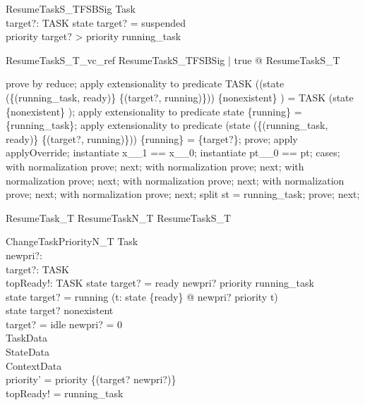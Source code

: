 \begin{schema}{ResumeTaskS\_TFSBSig}
  Task\\
  target?: TASK
\where
  state target? = suspended\\
  priority target? > priority running\_task
\end{schema}

\begin{theorem}{ResumeTaskS\_T\_vc\_ref}
\forall  ResumeTaskS\_TFSBSig | true @ \pre  ResumeTaskS\_T
\end{theorem}

\begin{zproof}
prove by reduce;
apply extensionality to predicate TASK \setminus  ((state \oplus  (\{(running\_task, ready)\} \cup  \{(target?, running)\})) \inv  \limg  \{nonexistent\} \rimg ) = TASK \setminus  (state \inv  \limg  \{nonexistent\} \rimg );
apply extensionality to predicate state \inv  \limg  \{running\} \rimg  = \{running\_task\};
apply extensionality to predicate (state \oplus  (\{(running\_task, ready)\} \cup  \{(target?, running)\})) \inv  \limg  \{running\} \rimg  = \{target?\};
prove;
apply applyOverride;
instantiate x\_\_1 == x\_\_0;
instantiate pt\_\_0 == pt;
cases;
with normalization prove;
next;
with normalization prove;
next;
with normalization prove;
next;
with normalization prove;
next;
with normalization prove;
next;
with normalization prove;
next;
split st = running\_task;
prove;
next;
\end{zproof}

\begin{zed}
ResumeTask\_T  ResumeTaskN\_T \lor  ResumeTaskS\_T
\end{zed}

\begin{schema}{ChangeTaskPriorityN\_T}
  \Delta Task\\
  newpri?: \nat \\
  target?: TASK\\
  topReady!: TASK
\where
  state target? = ready \implies  newpri? \leq  priority running\_task\\
  state target? = running \implies  (\forall  t: state \inv  \limg  \{ready\} \rimg  @ newpri? \geq  priority t)\\
  state target? \neq  nonexistent\\
  target? = idle \implies  newpri? = 0\\
  \Xi TaskData\\
  \Xi StateData\\
  \Xi ContextData\\
  priority' = priority \oplus  \{(target? \mapsto  newpri?)\}\\
  topReady! = running\_task
\end{schema}

